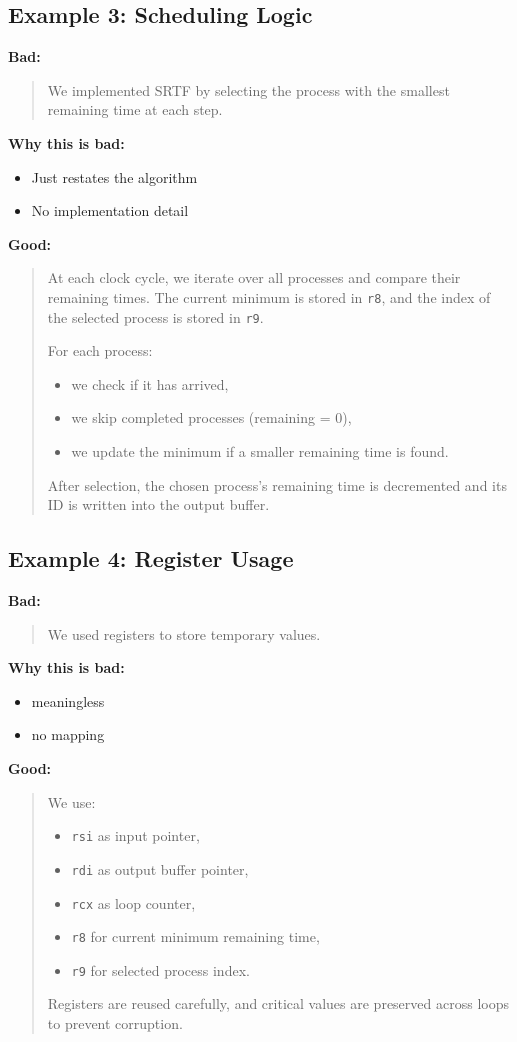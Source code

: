 \documentclass[a4paper,12pt]{article}
\begin{document}
\subsection*{Example 3: Scheduling Logic}

\textbf{Bad:}
\begin{quote}
We implemented SRTF by selecting the process with the smallest remaining time at each step.
\end{quote}

\textbf{Why this is bad:}
\begin{itemize}
\item Just restates the algorithm
\item No implementation detail
\end{itemize}

\textbf{Good:}
\begin{quote}
At each clock cycle, we iterate over all processes and compare their remaining times. 
The current minimum is stored in \texttt{r8}, and the index of the selected process is stored in \texttt{r9}. 

For each process:
\begin{itemize}
\item we check if it has arrived,
\item we skip completed processes (remaining = 0),
\item we update the minimum if a smaller remaining time is found.
\end{itemize}

After selection, the chosen process's remaining time is decremented and its ID is written into the output buffer. 

\end{quote}

\subsection*{Example 4: Register Usage}

\textbf{Bad:}
\begin{quote}
We used registers to store temporary values.
\end{quote}

\textbf{Why this is bad:}
\begin{itemize}
\item meaningless
\item no mapping
\end{itemize}

\textbf{Good:}
\begin{quote}
We use:
\begin{itemize}
\item \texttt{rsi} as input pointer,
\item \texttt{rdi} as output buffer pointer,
\item \texttt{rcx} as loop counter,
\item \texttt{r8} for current minimum remaining time,
\item \texttt{r9} for selected process index.
\end{itemize}

Registers are reused carefully, and critical values are preserved across loops to prevent corruption.
\end{quote}
\end{document}
